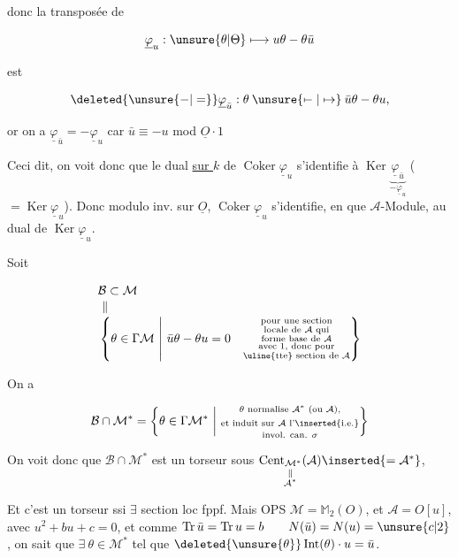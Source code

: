 
donc la transposée de \deleted{\unsure{$\underline{\varphi}$}}

\[
\underline{\varphi}_u:\unsure{\theta|\Theta}\longmapsto u\theta-\theta\bar u
\]

est

\[
\deleted{\unsure{-|=}}\underline{\varphi}_{\bar u}:\theta\mathbin{\unsure{\mapstochar\relbar|\mapsto}}\bar u\theta-\theta u,
\]

or on a $\underline{\varphi}_{\bar u}=-\underline{\varphi}_u$ car $\bar u\equiv-u$ mod $\underline O\cdot1$ 

Ceci dit, on voit donc que le dual \uline{sur $k$} de $\operatorname{Coker}\underline{\varphi}_u$ s'identifie à $\operatorname{Ker}\underbrace{\underline{\varphi}_{\bar u}}_{-\underline{\varphi}_u}$ ($=\operatorname{Ker}\underline{\varphi}_u$). Donc modulo  inv. sur $\underline O$, $\operatorname{Coker}\underline{\varphi}_u$ s'identifie, en  que $\mathcal A$-Module, au dual  de $\operatorname{Ker}\underline{\varphi}_u$.

Soit

\[
\begin{aligned}
&\mathcal B\subset\mathcal M\\[-2pt]
&\ \Vert\\[-2pt]
&\left\{\theta\in\Gamma\mathcal M\ \middle|\ \bar u\theta-\theta u=0\quad
\substack{\text{pour une section}\\\text{locale de }\mathcal A\text{ qui}\\\text{forme base de }\mathcal A\\\text{avec }1,\text{ donc pour}\\\text{\uline{tte} section de }\mathcal A}\right\}
\end{aligned}
\]

On a

\[
\mathcal B\cap\mathcal M^*=\left\{\theta\in\Gamma\mathcal M^*\ \middle|\
\substack{\theta\text{ normalise }\mathcal A^*\text{ (ou }\mathcal A\text{),}\\\text{et induit sur }\mathcal A\text{ l'}\inserted{\text{i.e.}}\strut\\\text{invol. can. }\sigma}\right\}
\]

On voit donc que $\mathcal B\cap\mathcal M^*$ est un torseur sous $\underset{\substack{\Vert\\\mathcal A^*}}{\operatorname{Cent}_{\mathcal M^*}(\mathcal A)}\inserted{=\mathcal A^*}$,

Et c'est un torseur ssi $\exists$ section loc fppf. Mais  OPS $\mathcal M=\mathbb M_2(O)$, et  $\mathcal A=O[u]$, avec $u^2+bu+c=0$, et comme $\operatorname{Tr}\bar u=\operatorname{Tr}u=b\qquad N(\bar u)=N(u)=\unsure{c|2}$, on sait que $\exists\ \theta\in\mathcal M^*$ tel que $\deleted{\unsure{\theta}}\operatorname{Int}(\theta)\cdot u=\bar u$.
